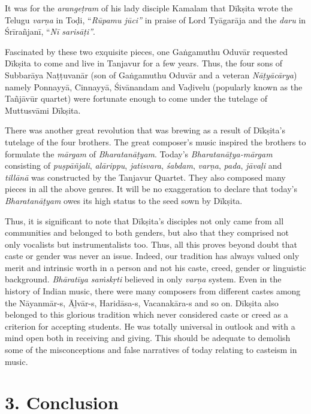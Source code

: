 It was for the \textit{arangeṭram} of his lady disciple Kamalam that Dīkṣita wrote the Telugu \textit{varṇa} in Toḍi, “\textit{Rūpamu jūci”} in praise of Lord Tyāgarāja and the \textit{daru} in Śrīrañjanī, “\textit{Nī sarisāṭi”}.

Fascinated by these two exquisite pieces, one Gaṅgamuthu Oduvār requested Dīkṣita to come and live in Tanjavur for a few years. Thus, the four sons of Subbarāya Naṭṭuvanār (son of Gaṅgamuthu Oduvār and a veteran \textit{Nāṭyācārya}) namely Ponnayyā, Cinnayyā, Śivānandam and Vaḍivelu (popularly known as the Tañjāvūr quartet) were fortunate enough to come under the tutelage of Muttusvāmi Dīkṣita.

There was another great revolution that was brewing as a result of Dīkṣita’s tutelage of the four brothers. The great composer’s music inspired the brothers to formulate the \textit{mārgam} of \textit{Bharatanāṭyam}. Today’s \textit{Bharatanāṭya-mārgam} consisting of \textit{puṣpāñjali}, \textit{alārippu}, \textit{jatisvara}, \textit{śabdam}, \textit{varṇa}, \textit{pada}, \textit{jāvaḷi} and \textit{tillānā} was constructed by the Tanjavur Quartet. They also composed many pieces in all the above genres. It will be no exaggeration to declare that today’s \textit{Bharatanāṭyam} owes its high status to the seed sown by Dīkṣita.

Thus, it is significant to note that Dīkṣita's disciples not only came from all communities and belonged to both genders, but also that they comprised not only vocalists but instrumentalists too. Thus, all this proves beyond doubt that caste or gender was never an issue. Indeed, our tradition has always valued only merit and intrinsic worth in a person and not his caste, creed, gender or linguistic background. \textit{Bhāratīya saṁskṛti} believed in only \textit{varṇa} system. Even in the history of Indian music, there were many composers from different castes among the Nāyanmār-s, Āḻvār-s, Haridāsa-s, Vacanakāra-s and so on. Dīkṣita also belonged to this glorious tradition which never considered caste or creed as a criterion for accepting students. He was totally universal in outlook and with a mind open both in receiving and giving. This should be adequate to demolish some of the misconceptions and false narratives of today relating to casteism in music.

\section*{3. Conclusion}


